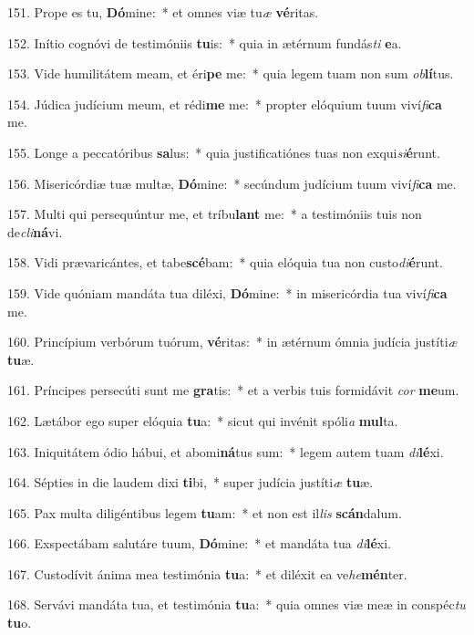 151. Prope es tu, \textbf{Dó}mine:~*  et omnes viæ tu\textit{æ} \textbf{vé}ritas.\

152. Inítio cognóvi de testimóniis \textbf{tu}is:~*  quia in ætérnum fundás\textit{ti} \textbf{e}a.\

153. Vide humilitátem meam, et éri\textbf{pe} me:~*  quia legem tuam non sum \textit{ob}\textbf{lí}tus.\

154. Júdica judícium meum, et rédi\textbf{me} me:~*  propter elóquium tuum viví\textit{fi}\textbf{ca} me.\

155. Longe a peccatóribus \textbf{sa}lus:~*  quia justificatiónes tuas non exqui\textit{si}\textbf{é}runt.\

156. Misericórdiæ tuæ multæ, \textbf{Dó}mine:~*  secúndum judícium tuum viví\textit{fi}\textbf{ca} me.\

157. Multi qui persequúntur me, et tríbu\textbf{lant} me:~*  a testimóniis tuis non de\textit{cli}\textbf{ná}vi.\

158. Vidi prævaricántes, et tabe\textbf{scé}bam:~*  quia elóquia tua non custo\textit{di}\textbf{é}runt.\

159. Vide quóniam mandáta tua diléxi, \textbf{Dó}mine:~*  in misericórdia tua viví\textit{fi}\textbf{ca} me.\

160. Princípium verbórum tuórum, \textbf{vé}ritas:~*  in ætérnum ómnia judícia justíti\textit{æ} \textbf{tu}æ.\

161. Príncipes persecúti sunt me \textbf{gra}tis:~*  et a verbis tuis formidávit \textit{cor} \textbf{me}um.\

162. Lætábor ego super elóquia \textbf{tu}a:~*  sicut qui invénit spóli\textit{a} \textbf{mul}ta.\

163. Iniquitátem ódio hábui, et abomi\textbf{ná}tus sum:~*  legem autem tuam \textit{di}\textbf{lé}xi.\

164. Sépties in die laudem dixi \textbf{ti}bi,~*  super judícia justíti\textit{æ} \textbf{tu}æ.\

165. Pax multa diligéntibus legem \textbf{tu}am:~*  et non est il\textit{lis} \textbf{scán}dalum.\

166. Exspectábam salutáre tuum, \textbf{Dó}mine:~*  et mandáta tua \textit{di}\textbf{lé}xi.\

167. Custodívit ánima mea testimónia \textbf{tu}a:~*  et diléxit ea ve\textit{he}\textbf{mén}ter.\

168. Servávi mandáta tua, et testimónia \textbf{tu}a:~*  quia omnes viæ meæ in conspéc\textit{tu} \textbf{tu}o.\

